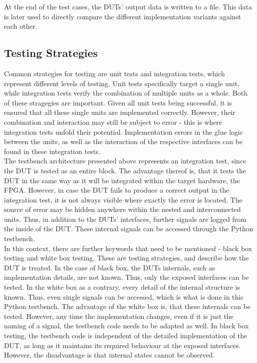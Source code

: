 At the end of the test cases, the DUTs' output data is written to a file.
This data is later used to directly compare the different implementation variants against each other.

\subsection{Testing Strategies}

Common strategies for testing are unit tests and integration tests, which represent different levels of testing.
Unit tests specifically target a single unit, while integration tests verify the combination of multiple units as a whole.
Both of these stragegies are important.
Given all unit tests being successful, it is ensured that all these single units are implemented correctly.
However, their combination and interaction may still be subject to error - this is where integration tests unfold their potential.
Implementation errors in the glue logic between the units, as well as the interaction of the respective interfaces can be found in these integration tests.\\

The testbench architecture presented above represents an integration test, since the DUT is tested as an entire block.
The advantage thereof is, that it tests the DUT in the same way as it will be integrated within the target hardware, the FPGA.
However, in case the DUT fails to produce a correct output in the integration test, it is not always visible where exactly the error is located.
The source of error may be hidden anywhere within the nested and interconnected units.
Thus, in addition to the DUTs' interfaces, further signals are logged from the inside of the DUT.
These internal signals can be accessed through the Python testbench.\\

In this context, there are further keywords that need to be mentioned - black box testing and white box testing.
These are testing strategies, and describe how the DUT is treated.
In the case of black box, the DUTs internals, such as implementation details, are not known.
Thus, only the exposed interfaces can be tested.
In the white box as a contrary, every detail of the internal structure is known.
Thus, even single signals can be accessed, which is what is done in this Python testbench.
The advantage of the white box is, that these internals can be tested.
However, any time the implementation changes, even if it is just the naming of a signal, the testbench code needs to be adapted as well.
In black box testing, the testbench code is independent of the detailed implementation of the DUT, as long as it maintains its required behaviour at the exposed interfaces.
However, the disadvantage is that internal states cannot be observed.\\

